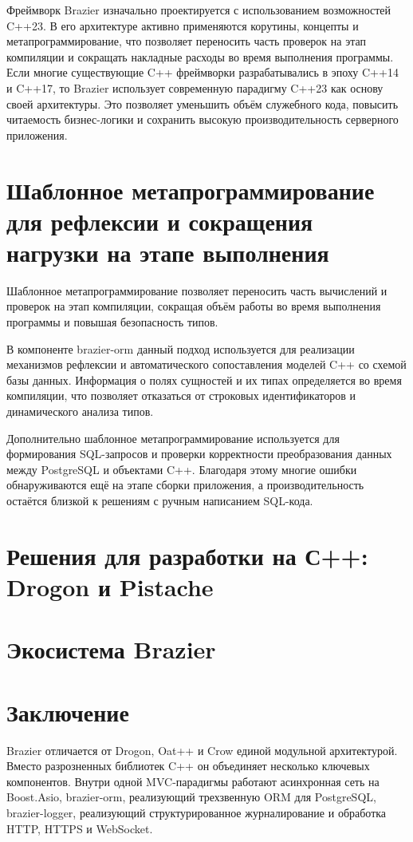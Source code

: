 \documentclass[14pt]{extarticle}
\begin{document}
Фреймворк Brazier изначально проектируется с использованием возможностей C++23. В его архитектуре активно применяются корутины, концепты и метапрограммирование, что позволяет переносить часть проверок на этап компиляции и сокращать накладные расходы во время выполнения программы. Если многие существующие C++ фреймворки разрабатывались в эпоху C++14 и C++17, то Brazier использует современную парадигму C++23 как основу своей архитектуры. Это позволяет уменьшить объём служебного кода, повысить читаемость бизнес-логики и сохранить высокую производительность серверного приложения.

\section{Шаблонное метапрограммирование для рефлексии и сокращения нагрузки на этапе выполнения}

Шаблонное метапрограммирование позволяет переносить часть вычислений и проверок на этап компиляции, сокращая объём работы во время выполнения программы и повышая безопасность типов. 

В компоненте brazier-orm данный подход используется для реализации механизмов рефлексии и автоматического сопоставления моделей C++ со схемой базы данных. Информация о полях сущностей и их типах определяется во время компиляции, что позволяет отказаться от строковых идентификаторов и динамического анализа типов. 

Дополнительно шаблонное метапрограммирование используется для формирования SQL-запросов и проверки корректности преобразования данных между PostgreSQL и объектами C++. Благодаря этому многие ошибки обнаруживаются ещё на этапе сборки приложения, а производительность остаётся близкой к решениям с ручным написанием SQL-кода.

\section{Решения для разработки на С++: Drogon и Pistache}

\section{Экосистема Brazier}

\section{Заключение}

Brazier отличается от Drogon, Oat++ и Crow единой модульной архитектурой. Вместо разрозненных библиотек C++ он объединяет несколько ключевых компонентов. Внутри одной MVC-парадигмы работают асинхронная сеть на Boost.Asio, brazier-orm, реализующий трехзвенную ORM для PostgreSQL, brazier-logger, реализующий структурированное журналирование и обработка HTTP, HTTPS и WebSocket.
\end{document}
